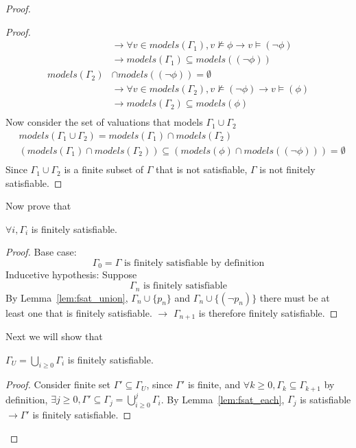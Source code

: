 \documentclass{article}
\newtheorem{lemma}[theorem]{Lemma}
\let\oldlemma\lemma
\let\endoldlemma\endlemma
\renewenvironment{lemma}
  {\begin{tcolorbox}[
      colback=green!8,
      colframe=green!50!black,
      boxrule=0.6pt,
      arc=2pt,
      left=6pt,right=6pt,top=4pt,bottom=4pt
    ]\oldlemma}
  {\endoldlemma\end{tcolorbox}}
\begin{document}
\begin{proof}
\begin{proof}
\begin{align*}
            &\rightarrow \forall v \in models(\Gamma_1), v\not \models \phi \rightarrow v \models (\neg \phi)\\
            &\rightarrow models(\Gamma_1) \subseteq models((\neg \phi))\\
            models(\Gamma_2) &\cap models((\neg \phi)) = \emptyset\\
            &\rightarrow \forall v \in models(\Gamma_2), v\not \models (\neg \phi) \rightarrow v \models (\phi)\\
            &\rightarrow models(\Gamma_2) \subseteq models(\phi)\\
        \end{align*}
        Now consider the set of valuations that models $\Gamma_1 \cup \Gamma_2$
        \begin{align*}
            &models(\Gamma_1 \cup \Gamma_2) = models(\Gamma_1) \cap models(\Gamma_2)\\
            &(models(\Gamma_1) \cap models(\Gamma_2)) \subseteq (models(\phi) \cap models((\neg \phi))) = \emptyset\\
        \end{align*}
        Since $\Gamma_1 \cup \Gamma_2$ is a finite subset of $\Gamma$ that is not satisfiable, $\Gamma$ is not finitely satisfiable. 
    \end{proof}
    Now prove that 
    \begin{lemma}\label{lem:fsat_each}
    $\forall i, \Gamma_i$ is finitely satisfiable.     
    \end{lemma}
    \begin{proof}
        Base case: 
        \[\Gamma_0 = \Gamma \text{ is finitely satisfiable by definition}\]
        Inducetive hypothesis: Suppose
        \[\Gamma_n \text{ is finitely satisfiable}\]
        By Lemma~\ref{lem:fsat_union}, $\Gamma_n \cup \{p_n\}$ and $\Gamma_n \cup \{(\neg p_n)\}$ there must be at least one that is finitely satisfiable.
        $\rightarrow$ $\Gamma_{n+1}$ is therefore finitely satisfiable.
    \end{proof}
    Next we will show that 
    \begin{lemma}\label{lem:fsat_all}
    $\Gamma_U = \bigcup_{i\geq0} \Gamma_i$ is finitely satisfiable.    
    \end{lemma}
    \begin{proof}
        Consider finite set $\Gamma' \subseteq \Gamma_U$, since $\Gamma'$ is finite, and $\forall k\geq 0, \Gamma_k \subseteq \Gamma_{k+1}$ by definition,
        $\exists j \geq 0, \Gamma' \subseteq \Gamma_j = \bigcup_{i\geq 0}^j \Gamma_i$. By Lemma~\ref{lem:fsat_each}, $\Gamma_j$ is satisfiable $\rightarrow \Gamma'$ is finitely satisfiable.

\end{proof}
\end{proof}
\end{document}
